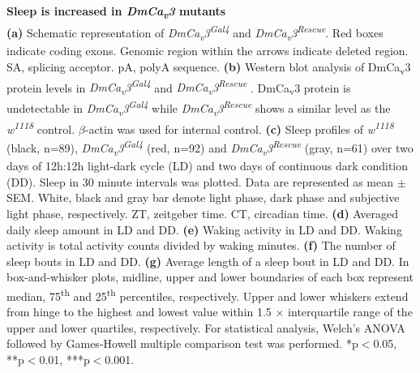 \label{fig:3}
\textbf{Sleep is increased in \emph{DmCa\textsubscript{v}3} mutants}
\\
\textbf{(a)} Schematic representation of \emph{DmCa\textsubscript{v}3\textsuperscript{Gal4}} and \emph{DmCa\textsubscript{v}3\textsuperscript{Rescue}}. 
Red boxes indicate coding exons.
Genomic region within the arrows indicate deleted region.
SA, splicing acceptor. pA, polyA sequence.  
\textbf{(b)} Western blot analysis of DmCa\textsubscript{v}3 protein levels in \emph{DmCa\textsubscript{v}3\textsuperscript{Gal4}} and \emph{DmCa\textsubscript{v}3\textsuperscript{Rescue}} .
DmCa\textsubscript{v}3 protein is undetectable in \emph{DmCa\textsubscript{v}3\textsuperscript{Gal4}} while \emph{DmCa\textsubscript{v}3\textsuperscript{Rescue}}  shows a similar level as the \emph{w\textsuperscript{1118}} control.
$\beta$-actin was used for internal control.
\textbf{(c)} Sleep profiles of \emph{w\textsuperscript{1118}} (black, n=89), \emph{DmCa\textsubscript{v}3\textsuperscript{Gal4}} (red, n=92) and \emph{DmCa\textsubscript{v}3\textsuperscript{Rescue}}  (gray, n=61) over two days of 12h:12h light-dark cycle (LD) and two days of continuous dark condition (DD).
Sleep in 30 minute intervals was plotted.
Data are represented as mean $\pm$ SEM.
White, black and gray bar denote light phase, dark phase and subjective light phase, respectively.
ZT, zeitgeber time.
CT, circadian time.
\textbf{(d)} Averaged daily sleep amount in LD and DD.
\textbf{(e)} Waking activity in LD and DD.
Waking activity is total activity counts divided by waking minutes.
\textbf{(f)} The number of sleep bouts in LD and DD.
\textbf{(g)} Average length of a sleep bout in LD and DD.
In box-and-whisker plots, midline, upper and lower boundaries of each box represent median, 75\textsuperscript{th} and 25\textsuperscript{th} percentiles, respectively.
Upper and lower whiskers extend from hinge to the highest and lowest value within 1.5 $\times$ interquartile range of the upper and lower quartiles, respectively.
For statistical analysis, Welch's ANOVA followed by Games-Howell multiple comparison test was performed.
*p$<$0.05, **p$<$0.01, ***p$<$0.001.
  
  
  
  
  
  
  
  
  